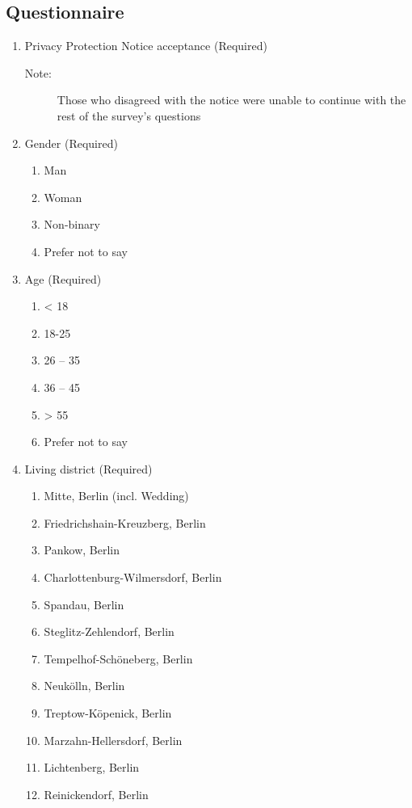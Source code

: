 \subsection*{Questionnaire}
\begin{enumerate}
	\item Privacy Protection Notice acceptance (Required)
	\begin{description}
		\item[Note:] Those who disagreed with the notice were unable to continue with the rest of the survey's questions
	\end{description}
	\item Gender (Required)
	\begin{enumerate}
		\item Man
		\item Woman
		\item Non-binary
		\item Prefer not to say
	\end{enumerate}
	\item Age (Required)
	\begin{enumerate}
		\item < 18
		\item 18-25
		\item 26 – 35
		\item 36 – 45 
		\item > 55
		\item 	Prefer not to say
	\end{enumerate}
	\item Living district (Required)
	\begin{enumerate}
		\item Mitte, Berlin (incl. Wedding) 
		\item	Friedrichshain-Kreuzberg, Berlin
		\item 	Pankow, Berlin
		\item	Charlottenburg-Wilmersdorf, Berlin
		\item	Spandau, Berlin
		\item	Steglitz-Zehlendorf, Berlin
		\item	Tempelhof-Schöneberg, Berlin
		\item	Neukölln, Berlin
		\item	Treptow-Köpenick, Berlin
		\item	Marzahn-Hellersdorf, Berlin
		\item	Lichtenberg, Berlin
		\item	Reinickendorf, Berlin

\end{enumerate}
\end{enumerate}
